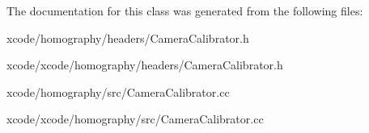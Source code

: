 The documentation for this class was generated from the following files\-:\begin{DoxyCompactItemize}
\item 
xcode/homography/headers/Camera\-Calibrator.\-h\item 
xcode/xcode/homography/headers/Camera\-Calibrator.\-h\item 
xcode/homography/src/Camera\-Calibrator.\-cc\item 
xcode/xcode/homography/src/Camera\-Calibrator.\-cc\end{DoxyCompactItemize}
